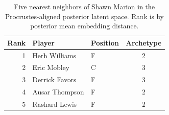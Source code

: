 \begin{table}[htbp]
  \centering\small
  \begin{tabular}{rllc}
    \toprule
    Rank & Player & Position & Archetype \\
    \midrule
    1 & Herb Williams & F & 2 \\
    2 & Eric Mobley & C & 3 \\
    3 & Derrick Favors & F & 3 \\
    4 & Ausar Thompson & F & 2 \\
    5 & Rashard Lewis & F & 2 \\
    \bottomrule
  \end{tabular}
  \caption{Five nearest neighbors of Shawn Marion in the Procrustes-aligned posterior latent space. Rank is by posterior mean embedding distance.}
  \label{tab:Shawn_Marion_neighbors}
\end{table}

